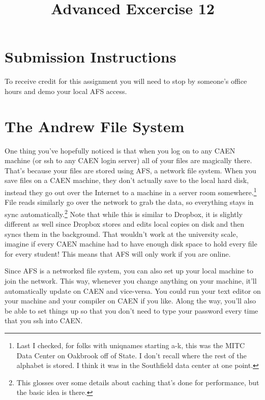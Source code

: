 \documentclass{article}
\begin{document}
\fancyfoot[C]{\color{gray} \thepage~/~\pageref*{LastPage}}
\pagestyle{fancyplain}


\title{\textbf{Advanced Excercise 12\\}}
\author{\textbf{\color{red}{Due: Saturday, April 8, 10:00PM (Hard Deadline)}}}
\date{}
\maketitle


\section*{Submission Instructions}
To receive credit for this assignment you will need to stop by someone's
office hours and demo your local AFS access.

\section*{The Andrew File System}

One thing you've hopefully noticed is that when you log on to any CAEN machine
(or ssh to any CAEN login server) all of your files are magically there.
That's because your files are stored using AFS, a network file system. When
you save files on a CAEN machine, they don't actually save to the local hard
disk, instead they go out over the Internet to a machine in a server room
somewhere.\footnote{Last I checked, for folks with uniqnames starting a-k,
this was the MITC Data Center on Oakbrook off of State. I don't recall where
the rest of the alphabet is stored. I think it was in the Southfield data
center at one point.} File reads similarly go over the network to grab the
data, so everything stays in sync automatically.\footnote{This glosses over
  some details about caching that's done for performance, but the basic idea
  is there.} Note that while this is similar to Dropbox, it is slightly
different as well since Dropbox stores and edits local copies on disk and then
syncs them in the background. That wouldn't work at the university scale,
imagine if every CAEN machine had to have enough disk space to hold every file
for every student! This means that AFS will only work if you are online.

Since AFS is a networked file system, you can also set up your local machine
to join the network.  This way, whenever you change anything on your machine,
it'll automatically update on CAEN and vice-versa. You could run your text
editor on your machine and your compiler on CAEN if you like. Along the way,
you'll also be able to set things up so that you don't need to type your
password every time that you ssh into CAEN.
\end{document}
